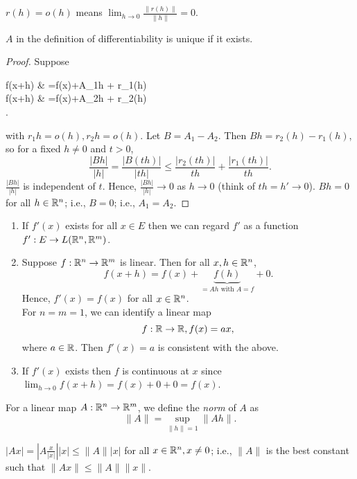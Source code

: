 \begin{notation}
	$r(h)=o(h)$ means $\lim_{h\to 0}{\frac{\|r(h)\|}{\|h\|}}=0$.
\end{notation}

\begin{thm}[12]
	$A$ in the definition of differentiability is unique if it exists.
	\begin{proof}
		Suppose
		\begin{flalign*}
			f(x+h) & =f(x)+A_{1}h + r_{1}(h) \\
			f(x+h) & =f(x)+A_{2}h + r_{2}(h) \\
			.\end{flalign*}
		with $r_{1}h=o(h), r_{2}h=o(h)$.
		Let $B=A_{1}-A_{2}$. Then $Bh=r_{2}(h)-r_{1}(h)$, so for a fixed $h\neq 0$ and $t>0$, \[
			\frac{\left|Bh\right|}{\left|h\right|}= \frac{\left|B(th)\right|}{\left|th\right|} \le \frac{\left|r_{2}(th)\right|}{th}+\frac{\left|r_{1}(th)\right|}{th}.\]
		$\frac{\left|Bh\right|}{\left|h\right|}$ is independent of $t$. Hence, $\frac{\left|Bh\right|}{\left|h\right|}\to 0$ as $h\to 0$ (think of $th=h'\to 0$).
		$Bh=0$ for all $h \in \mathbb{R}^{n}$; i.e., $B=0$; i.e., $A_{1}=A_{2}$.
	\end{proof}
	\begin{note}
		\begin{enumerate}
			\item If $f'(x)$ exists for all $x \in E$ then we can regard $f'$ as a function $f':E\to L(\mathbb{R}^{n},\mathbb{R}^{m})$.
			\item Suppose $f: \mathbb{R}^{n}\to \mathbb{R}^{m}$ is linear. Then for all $x,h \in \mathbb{R}^{n}$,
			      \[
				      f(x+h)=f(x)+\underbrace{f(h)}_{=Ah \text{ with } A=f}+0
				      .\]
			      Hence, $f'(x)=f(x)$ for all $x \in \mathbb{R}^{n}$.\\
			      For $n=m=1$, we can identify a linear map
			      \[
				      f: \mathbb{R}\to \mathbb{R}, f(x)=ax
				      ,\]
			      where $a \in \mathbb{R}$.
			      Then $f'(x)=a$ is consistent with the above.
			\item
			      If $f'(x)$ exists then $f$ is continuous at $x$ since $\lim_{h\to 0}{f(x+h)}=f(x)+0+0=f(x)$.
		\end{enumerate}
	\end{note}
\end{thm}

\begin{define}
	For a linear map $A: \mathbb{R}^{n}\to \mathbb{R}^{m}$, we define the \textit{norm} of $A$ as
	\[
		\|A\|=\sup_{\|h\|=1}{\|Ah\|}
		.\]

	\begin{note}
		$\left|Ax\right|=\left|A \frac{x}{\left|x\right|}\right| \left|x\right|\le \|A\| \left|x\right|$ for all $x \in \mathbb{R}^{n}, x\neq 0$; i.e., $\|A\|$ is the best constant such that $\|Ax\|\le \|A\| \|x\|$.
	\end{note}
\end{define}

